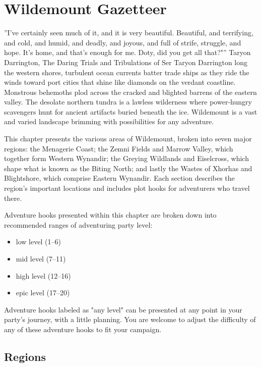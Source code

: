 \documentclass[10pt,a4paper,twoside,bg=print,twocolumn,openany,nodeprecatedcode]{dndbook}
\begin{document}
\chapter{Wildemount Gazetteer}
\DndQuote%
{}
{''I've certainly seen much of it, and it is very beautiful. Beautiful, and terrifying, and cold, and humid, and deadly, and joyous, and full of strife, struggle, and hope. It's home, and that's enough for me. Doty, did you get all that?"''}
{Taryon Darrington, The Daring Trials and Tribulations of Ser Taryon Darrington}
long the western shores, turbulent ocean currents batter trade ships as they ride the winds toward port cities that shine like diamonds on the verdant coastline. Monstrous behemoths plod across the cracked and blighted barrens of the eastern valley. The desolate northern tundra is a lawless wilderness where power-hungry scavengers hunt for ancient artifacts buried beneath the ice. Wildemount is a vast and varied landscape brimming with possibilities for any adventure.


This chapter presents the various areas of Wildemount, broken into seven major regions: the Menagerie Coast; the Zemni Fields and Marrow Valley, which together form Western Wynandir; the Greying Wildlands and Eiselcross, which shape what is known as the Biting North; and lastly the Wastes of Xhorhas and Blightshore, which comprise Eastern Wynandir. Each section describes the region's important locations and includes plot hooks for adventurers who travel there.

Adventure hooks presented within this chapter are broken down into recommended ranges of adventuring party level:


\begin{itemize}
\item low level (1–6)
\item mid level (7–11)
\item high level (12–16)
\item epic level (17–20)
\end{itemize}

Adventure hooks labeled as "any level" can be presented at any point in your party's journey, with a little planning. You are welcome to adjust the difficulty of any of these adventure hooks to fit your campaign.

\section{Regions}
\end{document}
